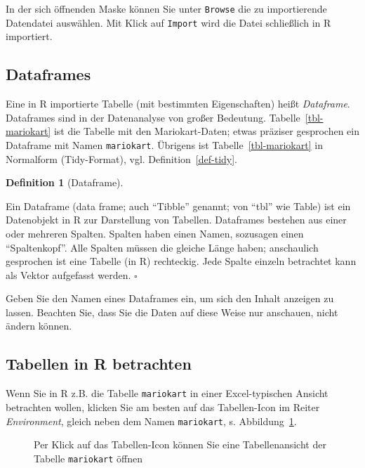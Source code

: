 \documentclass[
  letterpaper,
]{scrbook}
\theoremstyle{definition}
\theoremstyle{definition}
\theoremstyle{definition}
\newtheorem{definition}{Definition}[chapter]
\theoremstyle{remark}
\begin{document}
In der sich öffnenden Maske können Sie unter \texttt{Browse} die zu
importierende Datendatei auswählen. Mit Klick auf \texttt{Import} wird
die Datei schließlich in R importiert.

\subsection{Dataframes}\label{dataframes}

Eine in R importierte Tabelle (mit bestimmten Eigenschaften) heißt
\emph{Dataframe}. Dataframes sind in der Datenanalyse von großer
Bedeutung. Tabelle~\ref{tbl-mariokart} ist die Tabelle mit den
Mariokart-Daten; etwas präziser gesprochen ein Dataframe mit Namen
\texttt{mariokart}. Übrigens ist Tabelle~\ref{tbl-mariokart} in
Normalform (Tidy-Format), vgl. Definition~\ref{def-tidy}.

\begin{definition}[Dataframe]\protect\hypertarget{def-dataframe}{}\label{def-dataframe}

Ein Dataframe (data frame; auch \enquote{Tibble} genannt; von
\enquote{tbl} wie Table) ist ein Datenobjekt in R zur Darstellung von
Tabellen. Dataframes bestehen aus einer oder mehreren Spalten. Spalten
haben einen Namen, sozusagen einen \enquote{Spaltenkopf}. Alle Spalten
müssen die gleiche Länge haben; anschaulich gesprochen ist eine Tabelle
(in R) rechteckig. Jede Spalte einzeln betrachtet kann als Vektor
aufgefasst werden. \(\square\)

\end{definition}

Geben Sie den Namen eines Dataframes ein, um sich den Inhalt anzeigen zu
lassen. Beachten Sie, dass Sie die Daten auf diese Weise nur anschauen,
nicht ändern können.

\subsection{Tabellen in R betrachten}\label{sec-viewtab}

Wenn Sie in R z.B. die Tabelle \texttt{mariokart} in einer
Excel-typischen Ansicht betrachten wollen, klicken Sie am besten auf das
Tabellen-Icon im Reiter \emph{Environment}, gleich neben dem Namen
\texttt{mariokart}, s. Abbildung~\ref{fig-view-mariokart}.

\begin{figure}


\caption{\label{fig-view-mariokart}Per Klick auf das Tabellen-Icon
können Sie eine Tabellenansicht der Tabelle \texttt{mariokart} öffnen}

\end{figure}%
\end{document}
